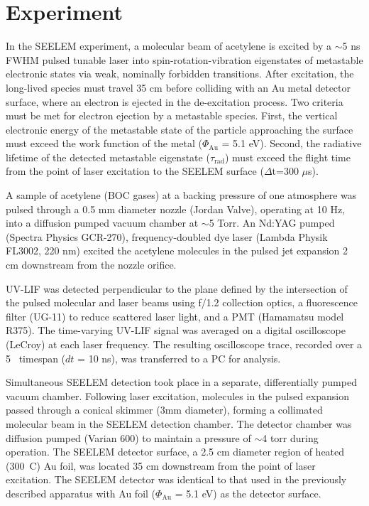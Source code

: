\documentclass[12pt]{mitthesis}
\begin{document}
\section{Experiment}

In the SEELEM experiment, a molecular beam of acetylene is excited by
a $\sim$5 ns FWHM pulsed tunable laser into spin-rotation-vibration
eigenstates of metastable electronic states via weak, nominally
forbidden transitions. After excitation, the long-lived species must
travel 35 cm before colliding with an Au metal detector surface, where
an electron is ejected in the de-excitation process. Two criteria must
be met for electron ejection by a metastable species. First, the
vertical electronic energy of the metastable state of the particle
approaching the surface must exceed the work function of the metal
($\Phi_{\text{Au}}$ = 5.1 eV). Second, the radiative lifetime of the
detected metastable eigenstate ($\tau_\text{rad}$) must exceed the
flight time from the point of laser excitation to the SEELEM surface
($\Delta$t=300 $\mu$s).

A sample of acetylene (BOC gases) at a backing pressure of one
atmosphere was pulsed through a 0.5 mm diameter nozzle (Jordan Valve),
operating at 10 Hz, into a diffusion pumped vacuum chamber at
$\sim$5 Torr.  An Nd:YAG pumped (Spectra Physics GCR-270),
frequency-doubled dye laser (Lambda Physik FL3002, 220 nm) excited the
acetylene molecules in the pulsed jet expansion 2 cm downstream from
the nozzle orifice.  %

UV-LIF was detected perpendicular to the plane defined by the
intersection of the pulsed molecular and laser beams using f/1.2
collection optics, a fluorescence filter (UG-11) to reduce scattered
laser light, and a PMT (Hamamatsu model R375).  The time-varying
UV-LIF signal was averaged on a digital oscilloscope (LeCroy) 
at each laser frequency.  The resulting oscilloscope trace,
recorded over a 5 \microsec\ timespan ($dt$ = 10 ns), was transferred
to a PC for analysis.

Simultaneous SEELEM detection took place in a separate, differentially
pumped vacuum chamber.  Following laser excitation, molecules in the
pulsed expansion passed through a conical skimmer (3mm diameter),
forming a collimated molecular beam in the SEELEM detection chamber.
The detector chamber was diffusion pumped (Varian 600) to maintain a
pressure of $\sim$4 torr during operation.  The SEELEM detector
surface, a 2.5 cm diameter region of heated (300\degrees\ C) Au foil,
was located 35 cm downstream from the point of laser excitation.  The
SEELEM detector was identical to that used in the previously described
apparatus with Au foil ($\Phi_{\text{Au}}$ = 5.1 eV) as the detector
surface.
\end{document}
